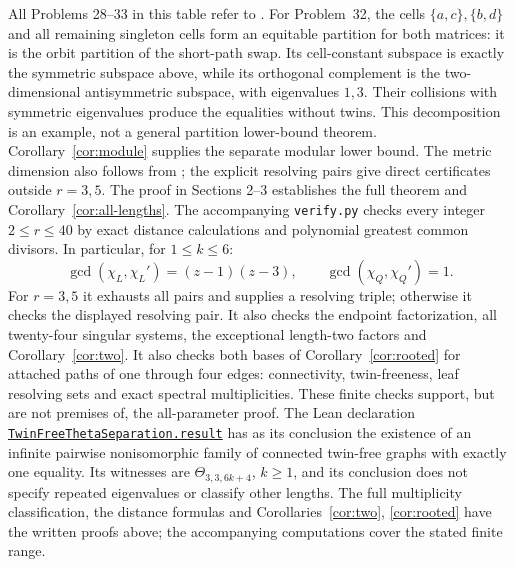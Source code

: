 \documentclass[11pt]{article}
\newcommand{\Th}{\Theta}
\begin{document}
All Problems 28--33 in this table refer to \cite[Section~9, p.~27]{AKS}.
For Problem~32, the cells $\{a,c\},\{b,d\}$ and all remaining singleton
cells form an equitable partition for both matrices: it is the orbit
partition of the short-path swap. Its cell-constant subspace is exactly
the symmetric subspace above, while its orthogonal complement is the
two-dimensional antisymmetric subspace, with eigenvalues $1,3$.
Their collisions with symmetric eigenvalues produce the equalities
without twins. This decomposition is an example, not a general partition
lower-bound theorem.
Corollary~\ref{cor:module} supplies the separate modular lower bound.
The metric dimension also follows from \cite[arXiv version, Theorems~8 and~14]{KSS};
the explicit resolving pairs give direct certificates outside $r=3,5$.
The proof in Sections 2--3 establishes the full theorem and
Corollary~\ref{cor:all-lengths}. The accompanying \texttt{verify.py} checks
every integer $2\leq r\leq40$ by exact distance calculations and
polynomial greatest common divisors. In particular, for $1\leq k\leq6$:
\[
 \gcd(\chi_L,\chi_L')=(z-1)(z-3),\qquad
 \gcd(\chi_Q,\chi_Q')=1.
\]
For $r=3,5$ it exhausts all pairs and supplies a resolving triple;
otherwise it checks the displayed resolving pair. It also checks the
endpoint factorization, all twenty-four singular systems, the exceptional
length-two factors and Corollary~\ref{cor:two}. It also checks both bases
of Corollary~\ref{cor:rooted} for attached paths of one through four edges:
connectivity, twin-freeness, leaf resolving sets and exact spectral
multiplicities. These finite checks support,
but are not premises of, the
all-parameter proof.
The Lean declaration
\href{https://github.com/the-omega-institute/trureturing/blob/d9bb8a406783c5222849b798f3c2ab738f653d75/D5/S3/Combinatorics/SpectralGraph/TwinFreeThetaSeparation.lean}{\texttt{TwinFreeThetaSeparation.result}}
has as its conclusion the existence of an infinite pairwise nonisomorphic family of
connected twin-free graphs with exactly one equality. Its witnesses are
$\Th_{3,3,6k+4}$, $k\geq1$, and its conclusion does not specify repeated
eigenvalues or classify other lengths. The full multiplicity classification,
the distance formulas and Corollaries~\ref{cor:two}, \ref{cor:rooted} have the written proofs
above; the accompanying computations cover the stated finite range.
\end{document}
